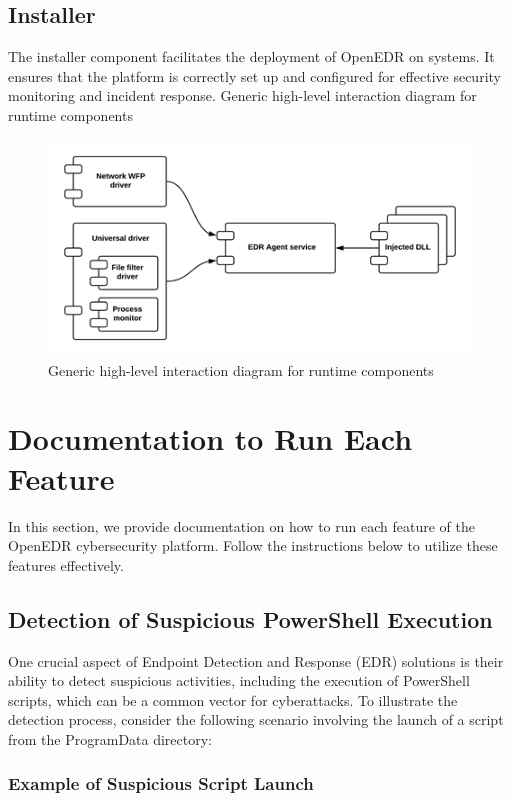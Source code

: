 \documentclass{article}
\begin{document}
\subsection{Installer}
The installer component facilitates the deployment of OpenEDR on systems. It ensures that the platform is correctly set up and configured for effective security monitoring and incident response. Generic high-level interaction diagram for runtime components
\begin{figure}[H]
    \centering
    \includegraphics[width=1\textwidth]{interaction-diagram.png}
    \caption{Generic high-level interaction diagram for runtime components}
    \label{fig:interaction_diagram}
\end{figure}



\section{Documentation to Run Each Feature}

In this section, we provide documentation on how to run each feature of the OpenEDR cybersecurity platform. Follow the instructions below to utilize these features effectively.

\subsection{Detection of Suspicious PowerShell Execution}

One crucial aspect of Endpoint Detection and Response (EDR) solutions is their ability to detect suspicious activities, including the execution of PowerShell scripts, which can be a common vector for cyberattacks. To illustrate the detection process, consider the following scenario involving the launch of a script from the ProgramData directory:

\subsubsection{Example of Suspicious Script Launch}
\end{document}
